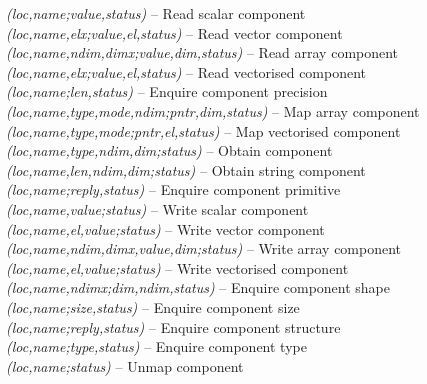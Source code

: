 \documentclass[twoside,11pt]{starlink}
\providecommand{\st}[1]{{\emph{#1}}}
\begin{document}
\label{appendix:cmproutines}
\small
\noindent
\textbf{}\st{(loc,name;value,status)} -- Read scalar component\\
\textbf{}\st{(loc,name,elx;value,el,status)} -- Read vector component\\
\textbf{}\st{(loc,name,ndim,dimx;value,dim,status)} -- Read array component\\
\textbf{}\st{(loc,name,elx;value,el,status)} -- Read vectorised component\\
\textbf{}\st{(loc,name;len,status)} -- Enquire component precision\\
\textbf{}\st{(loc,name,type,mode,ndim;pntr,dim,status)} -- Map array component\\
\textbf{}\st{(loc,name,type,mode;pntr,el,status)} -- Map vectorised component\\
\textbf{}\st{(loc,name,type,ndim,dim;status)} -- Obtain component\\
\textbf{}\st{(loc,name,len,ndim,dim;status)} -- Obtain string component\\
\textbf{}\st{(loc,name;reply,status)} -- Enquire component primitive\\
\textbf{}\st{(loc,name,value;status)} -- Write scalar component\\
\textbf{}\st{(loc,name,el,value;status)} -- Write vector component\\
\textbf{}\st{(loc,name,ndim,dimx,value,dim;status)} -- Write array component\\
\textbf{}\st{(loc,name,el,value;status)} -- Write vectorised component\\
\textbf{}\st{(loc,name,ndimx;dim,ndim,status)} -- Enquire component shape\\
\textbf{}\st{(loc,name;size,status)} -- Enquire component size\\
\textbf{}\st{(loc,name;reply,status)} -- Enquire component structure\\
\textbf{}\st{(loc,name;type,status)} -- Enquire component type\\
\textbf{}\st{(loc,name;status)} -- Unmap component\\
\end{document}
